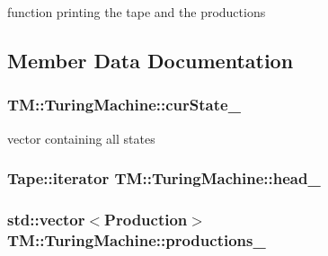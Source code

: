 function printing the tape and the productions 



\subsection{\-Member \-Data \-Documentation}
\hypertarget{classTM_1_1TuringMachine_aaa6438ae548569a1f41e024d1f68eb84}{
\subsubsection[{cur\-State\-\_\-}]{ {\bf \-T\-M\-::\-Turing\-Machine\-::cur\-State\-\_\-}}}\label{dd/d15/classTM_1_1TuringMachine_aaa6438ae548569a1f41e024d1f68eb84}


vector containing all states 

\hypertarget{classTM_1_1TuringMachine_a16c476c503a878de6f354339a283ca3b}{
\subsubsection[{head\-\_\-}]{\setlength{\rightskip}{0pt plus 5cm}\-Tape\-::iterator {\bf \-T\-M\-::\-Turing\-Machine\-::head\-\_\-}}}\label{dd/d15/classTM_1_1TuringMachine_a16c476c503a878de6f354339a283ca3b}
\hypertarget{classTM_1_1TuringMachine_a1aacd1eca81b8f4ab37030b3cda19d13}{
\subsubsection[{productions\-\_\-}]{\setlength{\rightskip}{0pt plus 5cm}std\-::vector$<${\bf \-Production}$>$ {\bf \-T\-M\-::\-Turing\-Machine\-::productions\-\_\-}}}\label{dd/d15/classTM_1_1TuringMachine_a1aacd1eca81b8f4ab37030b3cda19d13}


